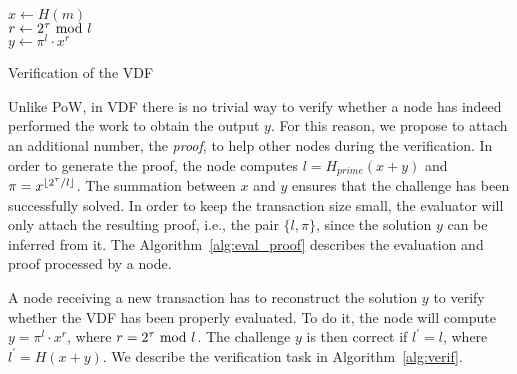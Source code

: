 \documentclass[../main.tex]{subfiles}
\begin{document}
\begin{algorithm}[ht]
\SetAlgoLined
{}


 $x\leftarrow H(m)$\\
 $r\leftarrow 2^\tau\ \mathrm{mod}\  l$\\
 $y\leftarrow \pi^l\cdot x^r$\\
 
 \caption{Verification of the VDF}\label{alg:verif}
\end{algorithm}

Unlike PoW, in VDF there is no trivial way to verify whether a node has indeed performed the work to obtain the output $y$. For this reason, we propose to attach an additional number, the \emph{proof}, to help other nodes during the verification. In order to generate the proof, the node computes $l=H_{prime}(x+y)$
and $\pi=x^{\lfloor2^\tau/l\rfloor}$.
The summation between $x$ and $y$ ensures that the challenge has been successfully solved. In order to keep the transaction size small, the evaluator will only attach the resulting proof, i.e., the pair $\{l, \pi\}$, since the solution $y$ can be inferred from it. The Algorithm~\ref{alg:eval_proof} describes the evaluation and proof processed by a node.

A node receiving a new transaction has to reconstruct the solution $y$ to verify whether the VDF has been properly evaluated. To do it, the node will compute $y=\pi^l\cdot x^r$, where $r=2^\tau\ \mathrm{mod}\  l$. The challenge $y$ is then correct if $l^\prime=l$, where $l^\prime=H(x+y)$. We describe the verification task in Algorithm~\ref{alg:verif}.
\end{document}

